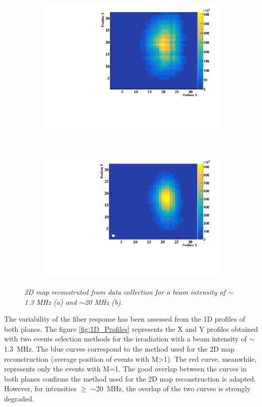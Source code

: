 \documentclass[a4paper,11pt]{article}
\begin{document}
\begin{figure}[H]
\centering
    \begin{subfigure}{0.45\textwidth} \centering \includegraphics[width=\textwidth]{figures/2D_Map_1MHz.pdf} \caption{} \label{fig:2D_1MHz}
    \end{subfigure}
    ~
    \begin{subfigure}{0.45\textwidth} \centering \includegraphics[width=\textwidth]{figures/2D_Map_20MHz.pdf} \caption{} \label{fig:2D_20MHz}
    \end{subfigure}
\caption{\small{\textit{2D map reconstruted from data collection for a beam intensity of $\sim$1.3 MHz (a) and $\sim$20 MHz (b).}}}
\label{fig:2D_Maps}
\end{figure}
The variability of the fiber response has been assessed from the 1D profiles of both planes. The figure \ref{fig:1D_Profiles} represents the X and Y profiles obtained with two events selection methods for the irradiation with a beam intensity of $\sim$1.3~MHz. The blue curves correspond to the method used  for the 2D map reconstruction (average position of events with M>1). The red curve, meanwhile, represents only the events with M=1. The good overlap between the curves in both planes confirms the method used for the 2D map reconstruction is adapted. However, for intensities $\geq$ $\sim$20~MHz, the overlap of the two curves is strongly degraded.
\end{document}
